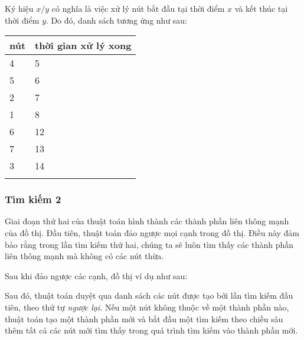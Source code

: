 Ký hiệu $x/y$ có nghĩa là
việc xử lý nút bắt đầu
tại thời điểm $x$ và kết thúc tại thời điểm $y$.
Do đó, danh sách tương ứng như sau:

\begin{tabular}{ll}
\\
nút & thời gian xử lý xong \\
\hline
4 & 5 \\
5 & 6 \\
2 & 7 \\
1 & 8 \\
6 & 12 \\
7 & 13 \\
3 & 14 \\
\\
\end{tabular}

\subsubsection{Tìm kiếm 2}

Giai đoạn thứ hai của thuật toán
hình thành các thành phần liên thông mạnh
của đồ thị.
Đầu tiên, thuật toán đảo ngược mọi
cạnh trong đồ thị.
Điều này đảm bảo rằng trong lần tìm kiếm thứ hai,
chúng ta sẽ luôn tìm thấy các thành phần liên thông mạnh
mà không có các nút thừa.

Sau khi đảo ngược các cạnh,
đồ thị ví dụ như sau:
\begin{center}
\end{center}

Sau đó, thuật toán duyệt qua
danh sách các nút được tạo bởi lần tìm kiếm đầu tiên,
theo thứ tự \emph{ngược lại}.
Nếu một nút không thuộc về một thành phần nào,
thuật toán tạo một thành phần mới
và bắt đầu một tìm kiếm theo chiều sâu
thêm tất cả các nút mới tìm thấy trong quá trình tìm kiếm
vào thành phần mới.

